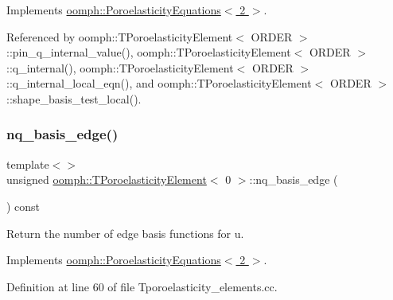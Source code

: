 Implements \hyperlink{classoomph_1_1PoroelasticityEquations_aec90144cc61d817c97bee414e90921af}{oomph\+::\+Poroelasticity\+Equations$<$ 2 $>$}.



Referenced by oomph\+::\+T\+Poroelasticity\+Element$<$ O\+R\+D\+E\+R $>$\+::pin\+\_\+q\+\_\+internal\+\_\+value(), oomph\+::\+T\+Poroelasticity\+Element$<$ O\+R\+D\+E\+R $>$\+::q\+\_\+internal(), oomph\+::\+T\+Poroelasticity\+Element$<$ O\+R\+D\+E\+R $>$\+::q\+\_\+internal\+\_\+local\+\_\+eqn(), and oomph\+::\+T\+Poroelasticity\+Element$<$ O\+R\+D\+E\+R $>$\+::shape\+\_\+basis\+\_\+test\+\_\+local().

\mbox{\label{classoomph_1_1TPoroelasticityElement_ac757396ac2f88ed07d6b3b0e7a364fb7}} 
\subsubsection{\texorpdfstring{nq\+\_\+basis\+\_\+edge()}{nq\_basis\_edge()}\hspace{0.1cm}{\footnotesize\ttfamily [1/3]}}
{\footnotesize\ttfamily template$<$$>$ \\
unsigned \hyperlink{classoomph_1_1TPoroelasticityElement}{oomph\+::\+T\+Poroelasticity\+Element}$<$ 0 $>$\+::nq\+\_\+basis\+\_\+edge (\begin{DoxyParamCaption}{ }\end{DoxyParamCaption}) const\hspace{0.3cm}{\ttfamily [virtual]}}



Return the number of edge basis functions for u. 



Implements \hyperlink{classoomph_1_1PoroelasticityEquations_a81b78261be29e506dc70a59c2925c061}{oomph\+::\+Poroelasticity\+Equations$<$ 2 $>$}.



Definition at line 60 of file Tporoelasticity\+\_\+elements.\+cc.

\mbox{\label{classoomph_1_1TPoroelasticityElement_a983a46fd022fae7bf5a4120a526a4e86}} 
